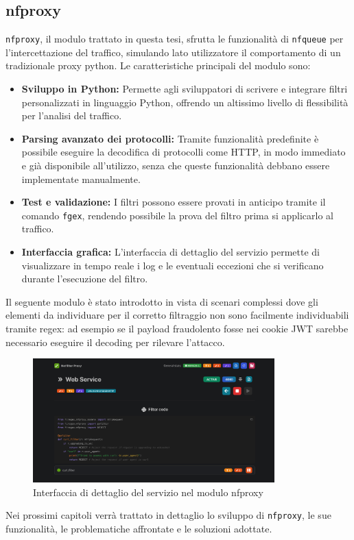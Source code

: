 \subsection{nfproxy}
\texttt{nfproxy}, il modulo trattato in questa tesi, sfrutta le funzionalità di \texttt{nfqueue} per l'intercettazione del traffico, simulando lato utilizzatore
il comportamento di un tradizionale proxy python. Le caratteristiche principali del modulo sono:
\begin{itemize}
    \setlength{\itemsep}{1pt}
    \setlength{\parskip}{1pt}
    \item \textbf{Sviluppo in Python:} Permette agli sviluppatori di scrivere e integrare filtri personalizzati in linguaggio Python, offrendo un altissimo livello di flessibilità per l'analisi del traffico.
    \item \textbf{Parsing avanzato dei protocolli:} Tramite funzionalità predefinite è possibile eseguire la decodifica di protocolli come HTTP, in modo immediato e già disponibile all'utilizzo,
    senza che queste funzionalità debbano essere implementate manualmente.
    \item \textbf{Test e validazione:} I filtri possono essere provati in anticipo tramite il comando \texttt{fgex}, rendendo possibile la prova del filtro prima si applicarlo al traffico.
    \item \textbf{Interfaccia grafica:} L'interfaccia di dettaglio del servizio permette di visualizzare in tempo reale i log e le eventuali eccezioni che si verificano durante l'esecuzione del filtro.
\end{itemize}

Il seguente modulo è stato introdotto in vista di scenari complessi dove gli elementi da individuare per il corretto filtraggio non sono facilmente
individuabili tramite regex: ad esempio se il payload fraudolento fosse nei cookie JWT sarebbe necessario eseguire il decoding per rilevare l'attacco.\\

\begin{figure}[H]
    \centering
    \includegraphics[width=0.83\textwidth]{images/chapter2/NFProxyInterface.png}
    \caption{Interfaccia di dettaglio del servizio nel modulo nfproxy}\label{fig:nfproxy_interface}
\end{figure}

Nei prossimi capitoli verrà trattato in dettaglio lo sviluppo di \texttt{nfproxy}, le sue funzionalità, le problematiche affrontate e le soluzioni adottate.
